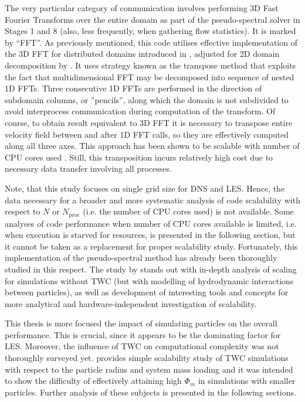 \documentclass{pracamgren}
\begin{document}
The very particular category of communication involves performing 3D Fast Fourier Transforms over the entire domain  as part of the pseudo-spectral solver in Stages 1 and 8 (also, less frequently, when gathering flow statistics).
It is marked by ``FFT''.
As previously mentioned, this code utilises effective implementation of the 3D FFT for distributed domains introduced in \textcite{Dmitruk2001}, adjusted for 2D domain decomposition by \textcite{Ayala2013}.
It uses strategy known as the transpose method that exploits the fact that multidimensional FFT may be decomposed into sequence of nested 1D FFTs.
Three consecutive 1D FFTs are performed in the direction of subdomain columns, or ''pencils'', along which the domain is not subdivided to avoid interprocess communication during computation of the transform.
Of course, to obtain result equivalent to 3D FFT it is necessary to transpose entire velocity field between and after 1D FFT calls, so they are effectively computed along all three axes.
This approach has been shown to be scalable with number of CPU cores used \parencite{Dmitruk2001,Ayala2013}.
Still, this transposition incurs relatively high cost due to necessary data transfer involving all processes.

\smallskip

Note, that this study focuses on single grid size for DNS and LES.
Hence, the data necessary for a broader and more systematic analysis of code scalability with respect to $N$ or $N_{\text{proc}}$ (i.e. the number of CPU cores used) is not available.
Some analyses of code performance when number of CPU cores available is limited, i.e. when execution is starved for resources, is presented in the following section, but it cannot be taken as a replacement for proper scalability study.
Fortunately, this implementation of the pseudo-spectral method has already been thoroughly studied in this respect.
The study by \textcite{Ayala2014} stands out with in-depth analysis of scaling for simulations without TWC (but with modelling of hydrodynamic interactions between particles), as well as development of interesting tools and concepts for more analytical and hardware-independent investigation of scalability. 

This thesis is more focused the impact of simulating particles on the overall performance.
This is crucial, since it appears to be the dominating factor for LES.
Moreover, the influence of TWC on computational complexity was not thoroughly surveyed yet.
\textcite[Fig. 1 therein]{Rosa2022} provides simple scalability study of TWC simulations with respect to the particle radius and system mass loading and it was intended to show the difficulty of effectively attaining high $\Phi_m$ in simulations with smaller particles.
Further analysis of these subjects is presented in the following sections.
\end{document}
